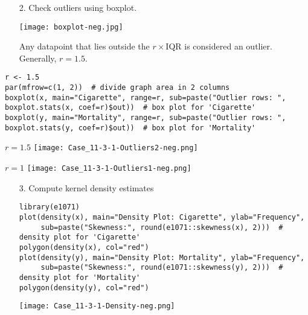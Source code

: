 \begin{frame}

	\begin{enumerate}
		\item[2.] Check outliers using boxplot.
			\vfill
			\begin{center}
				\texttt{[image: boxplot-neg.jpg]}
			\end{center}
			\vfill
		\item[] Any datapoint that lies outside the $r\times$IQR is considered an outlier.
			\\[1em]
			Generally, $r=1.5$.
			\end{enumerate}
	\end{frame} %
\begin{frame}[fragile]


	\begin{center}
\begin{lstlisting}
r <- 1.5
par(mfrow=c(1, 2))  # divide graph area in 2 columns
boxplot(x, main="Cigarette", range=r, sub=paste("Outlier rows: ", boxplot.stats(x, coef=r)$out))  # box plot for 'Cigarette'
boxplot(y, main="Mortality", range=r, sub=paste("Outlier rows: ", boxplot.stats(y, coef=r)$out))  # box plot for 'Mortality'
\end{lstlisting}
\vfill
\begin{minipage}{0.45\textwidth}
\centering
$r=1.5$
\texttt{[image: Case\_11-3-1-Outliers2-neg.png]}
\end{minipage}
\hfill
\begin{minipage}{0.45\textwidth}
\centering
$r=1$
\texttt{[image: Case\_11-3-1-Outliers1-neg.png]}
\end{minipage}
	\end{center}
\end{frame}
\begin{frame}[fragile]
	\begin{enumerate}
		\item[3.] Compute kernel density estimates
\vfill
\begin{center}
	\begin{minipage}{0.95\textwidth}
\begin{lstlisting}
library(e1071)
plot(density(x), main="Density Plot: Cigarette", ylab="Frequency",
     sub=paste("Skewness:", round(e1071::skewness(x), 2)))  # density plot for 'Cigarette'
polygon(density(x), col="red")
plot(density(y), main="Density Plot: Mortality", ylab="Frequency",
     sub=paste("Skewness:", round(e1071::skewness(y), 2)))  # density plot for 'Mortality'
polygon(density(y), col="red")
\end{lstlisting}
\end{minipage}
\texttt{[image: Case\_11-3-1-Density-neg.png]}
\end{center}
	\end{enumerate}
\end{frame}
